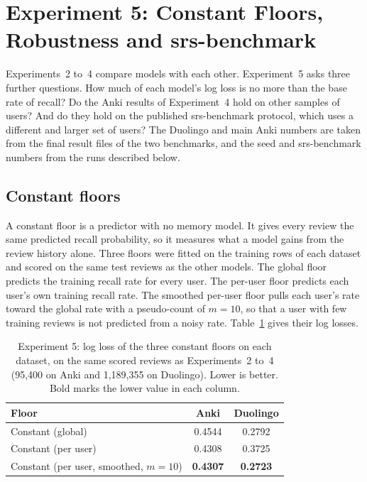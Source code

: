 \section{Experiment 5: Constant Floors, Robustness and srs-benchmark}
\label{sec:results-exp5}

Experiments~2 to~4 compare models with each other. Experiment~5 asks three further questions. How much of
each model's log loss is no more than the base rate of recall? Do the Anki results of Experiment~4 hold on
other samples of users? And do they hold on the published srs-benchmark protocol, which uses a different and
larger set of users? The Duolingo and main Anki numbers are taken from the final result files of the two benchmarks,
and the seed and srs-benchmark numbers from the runs described below.

\subsection{Constant floors}
\label{sec:results-exp5-floors}

A constant floor is a predictor with no memory model. It gives every review the same predicted recall
probability, so it measures what a model gains from the review history alone. Three floors were fitted on the
training rows of each dataset and scored on the same test reviews as the other models. The global floor predicts
the training recall rate for every user. The per-user floor predicts each user's own training recall rate. The
smoothed per-user floor pulls each user's rate toward the global rate with a pseudo-count of $m = 10$, so that a
user with few training reviews is not predicted from a noisy rate. Table~\ref{tab:exp5-floors} gives their log
losses.

\begin{table}[htbp]
  \centering
  \caption[Experiment 5: constant floors]{Experiment 5: log loss of the three constant floors on each dataset, on the same scored
    reviews as Experiments~2 to~4 (95,400 on Anki and 1,189,355 on Duolingo). Lower is better. Bold marks the lower value in each column.}
  \label{tab:exp5-floors}
  \begin{tabular}{@{}lcc@{}}
    \toprule
    Floor & Anki & Duolingo \\
    \midrule
    Constant (global) & 0.4544 & 0.2792 \\
    Constant (per user) & 0.4308 & 0.3725 \\
    Constant (per user, smoothed, $m = 10$) & \textbf{0.4307} & \textbf{0.2723} \\
    \bottomrule
  \end{tabular}
\end{table}

